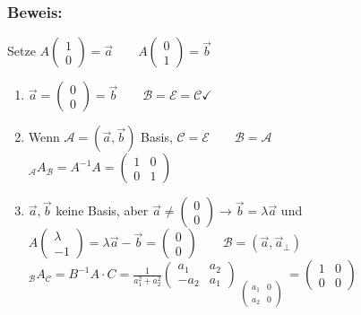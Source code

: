 \subsubsection{Beweis:}
Setze $A\begin{pmatrix} 1 \\ 0 \end{pmatrix} = \vec{a} \qquad A \begin{pmatrix} 0 \\ 1 \end{pmatrix} = \vec{b}$
\begin{enumerate}
	\item $\vec{a} = \begin{pmatrix} 0 \\ 0 \end{pmatrix} = \vec{b} \qquad \mathcal{B} = 
		\mathcal{E} = \mathcal{C} \checkmark$
	\item Wenn $\mathcal{A} = (\vec{a},\vec{b})$ Basis, $\mathcal{C}=\mathcal{E} \qquad 
		\mathcal{B}  = \mathcal{A}$ \\ 
		$_{\mathcal{A}}A_{\mathcal{B}}=A^{-1}A=\begin{pmatrix} 1 & 0 \\ 0 & 1 
		\end{pmatrix}$
	\item $\vec{a}, \vec{b}$ keine Basis, aber $\vec{a} \neq \begin{pmatrix} 0 \\ 0 
		\end{pmatrix} \rightarrow \vec{b} = \lambda \vec{a}$ und $A\begin{pmatrix}\lambda	
		\\ -1\end{pmatrix} = \lambda \vec{a} - \vec{b} = \begin{pmatrix} 0 \\ 0 
		\end{pmatrix} \qquad \mathcal{B} = (\vec{a},\vec{a}_{\perp})$\\
		$_{\mathcal{B}}A_{\mathcal{C}} = B^{-1}A\cdot C = \frac{1}{a_{1}^{2}+a_{2}^{2}} 
		\begin{pmatrix} a_{1} & a_{2} \\ -a_{2} & a_{1} \end{pmatrix} 
		\mathop{\underbrace{\begin{pmatrix} a_{1} & b_{1} \\ a_{2} & b_{2} 
		\end{pmatrix} \begin{pmatrix} 1 & \lambda \\ 0 & -1 
		\end{pmatrix}}}\limits_{\begin{pmatrix} a_{1} & 0 \\ a_{2} & 0 
		\end{pmatrix}}=\begin{pmatrix} 1 & 0 \\ 0 & 0 \end{pmatrix}$
\end{enumerate}